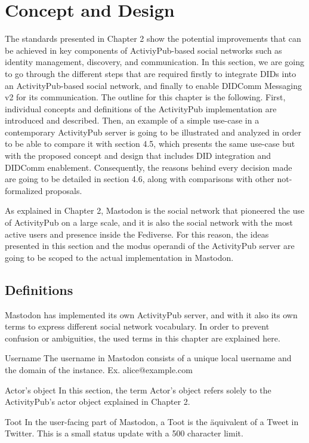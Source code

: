 \chapter{Concept and Design}
\label{cha:conceptanddesign}
 
The standards presented in Chapter 2 show the potential improvements that can be achieved in key components of ActiviyPub-based social networks such as identity management, discovery, and communication. In this section, we are going to go through the different steps that are required firstly to integrate DIDs into an ActivityPub-based social network, and finally to enable DIDComm Messaging v2 for its communication. 
The outline for this chapter is the following. First, individual concepts and definitions of the ActivityPub implementation are introduced and described. Then, an example of a simple use-case in a contemporary ActivityPub server is going to be illustrated and analyzed in order to be able to compare it with section 4.5, which presents the same use-case but with the proposed concept and design that includes DID integration and DIDComm enablement. Consequently, the reasons behind every decision made are going to be detailed in section 4.6, along with comparisons with other not-formalized proposals. 
 
As explained in Chapter 2, Mastodon is the social network that pioneered the use of ActivityPub on a large scale, and it is also the social network with the most active users and presence inside the Fediverse. For this reason, the ideas presented in this section and the modus operandi of the ActivityPub server are going to be scoped to the actual implementation in Mastodon.  
 
 
\section*{Definitions}
Mastodon has implemented its own ActivityPub server, and with it also its own terms to express different social network vocabulary. In order to prevent confusion or ambiguities, the used terms in this chapter are explained here. 
 
Username
The username in Mastodon consists of a unique local username and the domain of the instance. Ex. alice@example.com
 
Actor’s object
In this section, the term Actor’s object refers solely to the ActivityPub’s actor object explained in Chapter 2. 
 
Toot 
In the user-facing part of Mastodon, a Toot is the äquivalent of a Tweet in Twitter. This is a small status update with a 500 character limit. 
 
